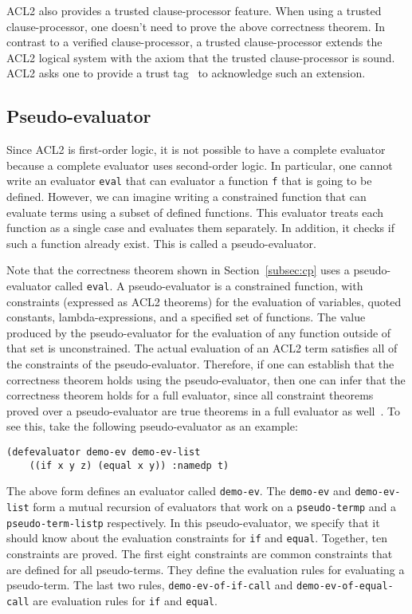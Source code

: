 ACL2 also provides a trusted clause-processor feature. When using a trusted
clause-processor, one doesn't need to prove the above correctness theorem. In
contrast to a verified clause-processor, a trusted clause-processor extends the
ACL2 logical system with the axiom that the trusted clause-processor is sound.
ACL2 asks one to provide a trust tag~\cite{defttag} to acknowledge such an
extension.

\subsection{Pseudo-evaluator}
Since ACL2 is first-order logic, it is not possible to have a complete evaluator
because a complete evaluator uses second-order logic. In particular,
one cannot write an evaluator \texttt{eval} that can evaluator a function
\texttt{f} that is going to be defined. However, we can imagine writing a
constrained function that can evaluate terms using a subset of defined
functions. This evaluator treats each function as a single case and evaluates
them separately. In addition, it checks if such a function already exist. This
is called a pseudo-evaluator. 

Note that the correctness theorem shown in Section~\ref{subsec:cp} uses a
pseudo-evaluator called \texttt{eval}. A pseudo-evaluator is a constrained
function, with constraints (expressed as ACL2 theorems) for the evaluation of
variables, quoted constants, lambda-expressions, and a specified set of
functions.  The value produced by the pseudo-evaluator for the evaluation of any
function outside of that set is unconstrained.  The actual evaluation of an ACL2
term satisfies all of the constraints of the pseudo-evaluator. Therefore, if one
can establish that the correctness theorem holds using the pseudo-evaluator,
then one can infer that the correctness theorem holds for a full evaluator,
since all constraint theorems proved over a pseudo-evaluator are true theorems
in a full evaluator as well~\cite{kaufmann2017}. To see this, take the following
pseudo-evaluator as an example:

\begin{lstlisting}[style=lisp]
  (defevaluator demo-ev demo-ev-list
    ((if x y z) (equal x y)) :namedp t)
\end{lstlisting}

The above form defines an evaluator called \texttt{demo-ev}. The
\texttt{demo-ev} and \texttt{demo-ev-list} form a mutual recursion of evaluators
that work on a \texttt{pseudo-termp} and a \texttt{pseudo-term-listp}
respectively. In this pseudo-evaluator, we specify that it should know about the
evaluation constraints for \texttt{if} and \texttt{equal}. Together, ten
constraints are proved.
The first eight constraints are common constraints that are defined for all
pseudo-terms. They define the evaluation rules for evaluating a pseudo-term. The
last two rules, \texttt{demo-ev-of-if-call} and \texttt{demo-ev-of-equal-call}
are evaluation rules for \texttt{if} and \texttt{equal}.

